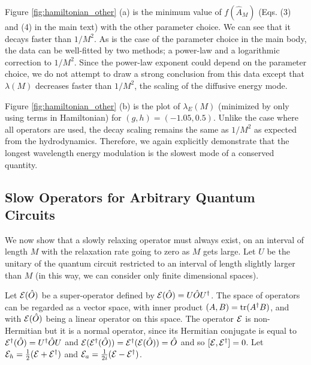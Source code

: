\documentclass[twocolumn,superscriptaddress, prl,showpacs]{revtex4-1}
\begin{document}
Figure \ref{fig:hamiltonian_other} (a) is the minimum value of $f(\hat{A}_M)$ (Eqs. (3) and (4) in the main text) with the other parameter choice.
We can see that it decays faster than $1/M^2$. As is the case of the parameter choice in the main body,
the data can be well-fitted by two methods; a power-law and a logarithmic correction to $1/M^2$.
Since the power-law exponent could depend on the parameter choice, we do not attempt to draw a strong conclusion from this data
except that $\lambda(M)$ decreases faster than $1/M^2$,
the scaling of the diffusive energy mode.

Figure \ref{fig:hamiltonian_other} (b) is the plot of $\lambda_E(M)$ (minimized by only using terms in Hamiltonian)
for $(g,h) = (-1.05, 0.5)$. Unlike the case where all operators are used,
the decay scaling remains the same as $1/M^2$ as expected from the hydrodynamics.
Therefore, we again explicitly demonstrate that the longest wavelength energy modulation is the slowest mode of a conserved quantity.


\subsection{Slow Operators for Arbitrary Quantum Circuits}
We now show that a slowly relaxing operator must always exist, on an interval of length $M$ with the relaxation rate going to zero as $M$ gets large.  Let $U$ be the unitary of the quantum circuit restricted to an interval of length slightly larger than $M$ (in this way, we can consider only finite dimensional spaces).

Let ${\cal E}(\hat{O})$ be a super-operator defined by ${\cal E}(\hat{O})=U\hat{O}U^\dagger$.  The space of operators can be regarded as a vector space, with inner product $(A,B)={\rm tr}(A^\dagger B)$, and with ${\cal E}(\hat{O})$ being a linear operator on this space.  The operator ${\cal E}$ is non-Hermitian but it is a normal operator, since its Hermitian conjugate is equal to ${\cal E}^\dagger(\hat{O})=U^\dagger \hat{O} U$ and ${\cal E}({\cal E}^\dagger(\hat{O}))={\cal E}^\dagger({\cal E}(\hat{O}))=\hat{O}$ and so $[{\cal E},{\cal E}^\dagger]=0$.
Let ${\cal E}_h=\frac{1}{2}({\cal E}+{\cal E}^\dagger)$ and ${\cal E}_a=\frac{1}{2i}({\cal E}-{\cal E}^\dagger)$.
\end{document}
